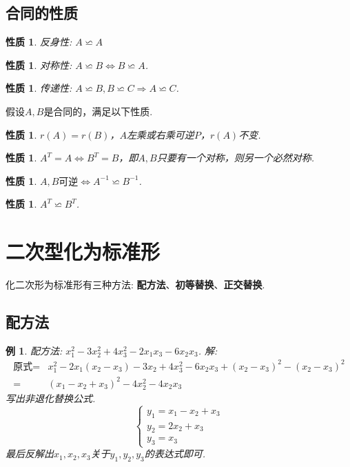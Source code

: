 \documentclass[12pt, a4paper, oneside]{ctexbook}
\newtheorem{example}[theorem]{例}
\newtheorem{quolity}[theorem]{性质}
\begin{document}
\subsection{合同的性质}

\begin{quolity}
    反身性: $A \backsimeq A$
\end{quolity}

\begin{quolity}
    对称性: $A \backsimeq B \Leftrightarrow B \backsimeq A$. 
\end{quolity}

\begin{quolity}
    传递性: $A \backsimeq B, B \backsimeq C \Rightarrow A \backsimeq C$. 
\end{quolity}

假设$A,B$是合同的，满足以下性质. 

\begin{quolity}
    $r(A) = r(B)$，$A$左乘或右乘可逆$P$，$r(A)$不变. 
\end{quolity}

\begin{quolity}
    $A^T = A \Leftrightarrow B^T = B$，即$A,B$只要有一个对称，则另一个必然对称. 
\end{quolity}

\begin{quolity}
    $A,B\mbox{可逆} \Leftrightarrow A^{-1} \backsimeq B^{-1}$. 
\end{quolity}

\begin{quolity}
    $A^T \backsimeq B^T$. 
\end{quolity}

\section{二次型化为标准形}

化二次形为标准形有三种方法: \textbf{配方法}、\textbf{初等替换}、\textbf{正交替换}. 

\subsection{配方法}

\begin{example}
    配方法: $x_1^2 - 3x_2^2 + 4x_3^2 - 2x_1x_3 - 6x_2x_3$. 
    \newline
    解: $$\begin{aligned}
        \mbox{原式} =& x_1^2 - 2x_1(x_2-x_3)  - 3x_2 + 4x_3^2 - 6x_2x_3 + (x_2 - x_3)^2 -(x_2 - x_3)^2 \\
        =& (x_1 - x_2 + x_3)^2 -4x_2^2 - 4x_2x_3
    \end{aligned}$$
    写出非退化替换公式. 
    $$\begin{cases}
        y_1 = x_1 - x_2 + x_3 \\
        y_2 = 2x_2 + x_3 \\
        y_3 = x_3
    \end{cases}$$
    最后反解出$x_1,x_2,x_3$关于$y_1,y_2,y_3$的表达式即可. 
\end{example}
\end{document}
